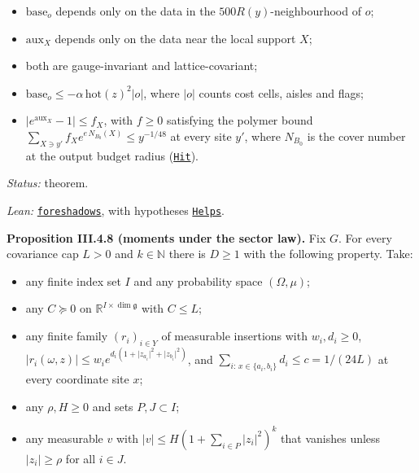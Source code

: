 \documentclass[
  letterpaper,
  11pt]{article}
\providecommand{\tightlist}{%
  \setlength{\itemsep}{0pt}\setlength{\parskip}{0pt}}
\begin{document}
\begin{itemize}
\tightlist
\item
  \(\mathrm{base}_o\) depends only on the data in the
  \(500R(y)\)-neighbourhood of \(o\);
\item
  \(\mathrm{aux}_X\) depends only on the data near the local support
  \(X\);
\item
  both are gauge-invariant and lattice-covariant;
\item
  \(\mathrm{base}_o\le-\alpha\,\mathrm{hot}(z)^2\lvert o\rvert\), where
  \(\lvert o\rvert\) counts cost cells, aisles and flags;
\item
  \(\lvert e^{\mathrm{aux}_X}-1\rvert\le f_X\), with \(f\ge0\)
  satisfying the polymer bound
  \(\sum_{X\ni y'}f_Xe^{e\,N_{B_0}(X)}\le y^{-1/48}\) at every site
  \(y'\), where \(N_{B_0}\) is the cover number at the output budget
  radius
  (\href{https://github.com/yang-mills-group/OpenAI-YM-20261028/blob/3456e5e75cf8d4cd558955a5c7638fba2d68f464/YM/Ac/Tree.lean\#L12-L13}{\texttt{Hit}}).
\end{itemize}

\emph{Status:} theorem.

\emph{Lean:}
\href{https://github.com/yang-mills-group/OpenAI-YM-20261028/blob/3456e5e75cf8d4cd558955a5c7638fba2d68f464/YM/PhysicalNext/AFTERNOON_INTERACTING_RANK_COMPARISON/Opacity/Gush.lean\#L96-L134}{\texttt{foreshadows}},
with hypotheses
\href{https://github.com/yang-mills-group/OpenAI-YM-20261028/blob/3456e5e75cf8d4cd558955a5c7638fba2d68f464/YM/PhysicalNext/AFTERNOON_INTERACTING_RANK_COMPARISON/Opacity/Gush.lean\#L82-L95}{\texttt{Helps}}.

\textbf{Proposition III.4.8 (moments under the sector law).} Fix \(G\).
For every covariance cap \(L>0\) and \(k\in\mathbb N\) there is
\(D\ge1\) with the following property. Take:

\begin{itemize}
\tightlist
\item
  any finite index set \(I\) and any probability space \((\Omega,\mu)\);
\item
  any \(C\succeq0\) on \(\mathbb R^{I\times\dim\mathfrak g}\) with
  \(C\le L\);
\item
  any finite family \((r_i)_{i\in Y}\) of measurable insertions with
  \(w_i,d_i\ge0\),
  \(\lvert r_i(\omega,z)\rvert\le w_ie^{d_i(1+\lvert z_{a_i}\rvert^2+\lvert z_{b_i}\rvert^2)}\),
  and \(\sum_{i:\,x\in\{a_i,b_i\}}d_i\le c=1/(24L)\) at every coordinate
  site \(x\);
\item
  any \(\rho,H\ge0\) and sets \(P,J\subset I\);
\item
  any measurable \(v\) with
  \(\lvert v\rvert\le H(1+\sum_{i\in P}\lvert z_i\rvert^2)^k\) that
  vanishes unless \(\lvert z_i\rvert\ge\rho\) for all \(i\in J\).
\end{itemize}
\end{document}
